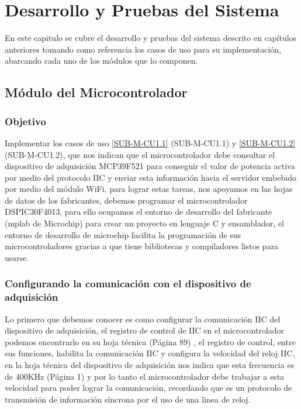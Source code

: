 
\chapter{Desarrollo y Pruebas del Sistema}\label{chapter5}

En este capitulo se cubre el desarrollo y pruebas del sistema descrito en capítulos anteriores tomando como referencia los casos de uso para su implementación, abarcando cada uno de los módulos que lo componen.

\section{Módulo del Microcontrolador}

\subsection{Objetivo}
Implementar los casos de uso \ref{SUB-M-CU1.1} (SUB-M-CU1.1) y \ref{SUB-M-CU1.2} (SUB-M-CU1.2), que nos indican que el microcontrolador debe consultar el dispositivo de adquisición MCP39F521 para conseguir el valor de potencia activa por medio del protocolo IIC y enviar esta información hacia el servidor embebido por medio del módulo WiFi, para lograr estas tareas, nos apoyamos en las hojas de datos de los fabricantes, debemos programar el microcontrolador DSPIC30F4013, para ello ocupamos el entorno de desarrollo del fabricante (mplab de Microchip) para crear un proyecto en lenguaje C y ensamblador, el entorno de desarrollo de microchip facilita la programación de sus microcontroladores gracias a que tiene bibliotecas y compiladores listos para usarse.

\subsection{Configurando la comunicación con el dispositivo de adquisición}
Lo primero que debemos conocer es como configurar la comunicación IIC del dispositivo de adquisición, el registro de control de IIC en el microcontrolador podemos encontrarlo en su hoja técnica (Página 89) \citep{DatasheetDSPIC30F4013}, el registro de control, entre sus funciones, habilita la comunicación IIC y configura la velocidad del reloj IIC, en la hoja técnica del dispositivo de adquisición nos indica que esta frecuencia es de 400KHz (Página 1) \citep{DatasheetDSPIC30F4013} y por lo tanto el microcontrolador debe trabajar a esta velocidad para poder lograr la comunicación, recordando que es un protocolo de transmisión de información síncrona por el uso de una linea de reloj.

